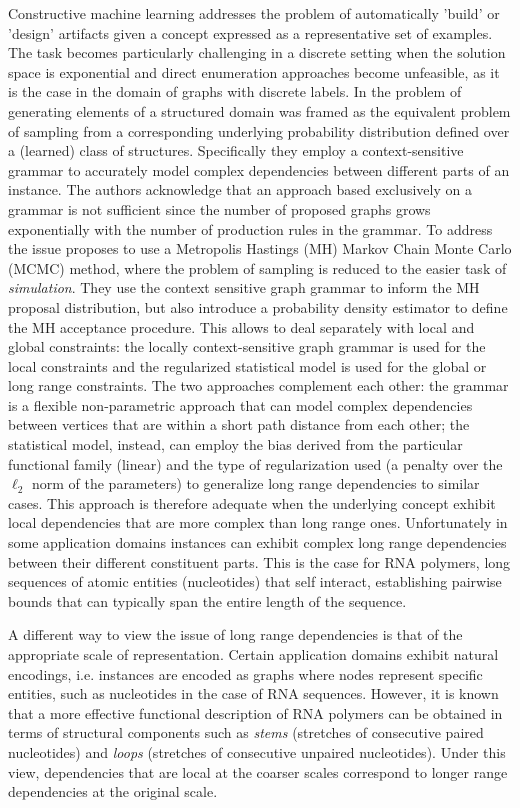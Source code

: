 \documentclass{article}
\begin{document}
Constructive machine learning addresses the problem of automatically 'build'
or 'design' artifacts given a concept expressed as a representative set of
examples. The task becomes particularly challenging in a discrete setting when
the solution space is exponential and direct enumeration approaches become
unfeasible, as it is the case in the domain of graphs with discrete labels. In
\cite{costa16} the problem of generating elements of a structured domain was
framed as the equivalent problem of sampling from a corresponding underlying
probability distribution defined over a (learned) class of structures.
Specifically they employ a context-sensitive grammar to accurately model
complex dependencies between different parts of an instance. The authors
acknowledge that an approach based exclusively on a grammar is not sufficient
since the number of proposed graphs grows exponentially with the number of
production rules in the grammar. To address the issue \cite{costa16} proposes
to use a Metropolis Hastings (MH) Markov Chain Monte Carlo (MCMC) method,
where the problem of sampling is reduced to the easier task of {\em
simulation}. They use the context sensitive graph grammar to inform the MH
proposal distribution, but also introduce a probability density estimator to
define the MH acceptance procedure. This allows to deal separately with local
and global constraints: the locally context-sensitive graph grammar is used
for the local constraints and the regularized statistical model is used for
the global or long range constraints. The two approaches complement each
other: the grammar is a flexible non-parametric approach that can model
complex dependencies between vertices that are within a short path distance
from each other; the statistical model, instead, can employ the bias derived
from the particular functional family (linear) and the type of regularization
used (a penalty over the $\ell_2$ norm of the parameters) to generalize long
range dependencies to similar cases.
This approach is therefore adequate when the underlying concept exhibit local
dependencies that are more complex than long range ones.  Unfortunately in
some application domains instances can exhibit complex long range dependencies
between their different constituent parts. This is the case for RNA polymers,
long sequences of atomic entities (nucleotides) that self interact,
establishing pairwise bounds that can typically span the entire length of the
sequence.

A different way to view the issue of long range dependencies is that of the
appropriate scale of representation. Certain application domains exhibit
natural encodings, i.e. instances are encoded as graphs where nodes represent
specific entities, such as nucleotides in the case of RNA sequences. However,
it is known that a more effective functional description of RNA polymers can
be obtained in terms of structural components such as {\em stems} (stretches
of consecutive paired nucleotides) and {\em loops} (stretches of consecutive
unpaired nucleotides). Under this view, dependencies that are local at the
coarser scales correspond to longer range dependencies at the original scale.
\end{document}
